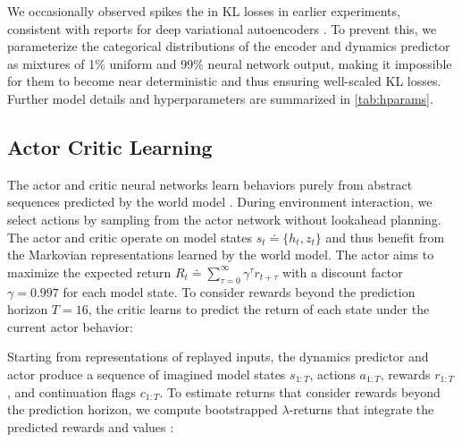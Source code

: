 We occasionally observed spikes the in KL losses in earlier experiments, consistent with reports for deep variational autoencoders \citep{vahdat2020nvae,child2020vdvae}. To prevent this, we parameterize the categorical distributions of the encoder and dynamics predictor as mixtures of 1\% uniform and 99\% neural network output, making it impossible for them to become near deterministic and thus ensuring well-scaled KL losses. Further model details and hyperparameters are summarized in \cref{tab:hparams}.

\subsection*{Actor Critic Learning}

The actor and critic neural networks learn behaviors purely from abstract sequences predicted by the world model \citep{sutton1991dyna,ha2018worldmodels}.
During environment interaction, we select actions by sampling from the actor network without lookahead planning.
The actor and critic operate on model states $s_t \doteq \{h_t,z_t\}$ and thus benefit from the Markovian representations learned by the world model.
The actor aims to maximize the expected return $R_t \doteq \textstyle\sum_{\tau=0}^\infty \gamma^\tau r_{t+\tau}$ with a discount factor $\gamma=0.997$ for each model state.
To consider rewards beyond the prediction horizon $T=16$, the critic learns to predict the return of each state under the current actor behavior:


Starting from representations of replayed inputs, the dynamics predictor and actor produce a sequence of
imagined model states $s_{1:T}$, actions $a_{1:T}$, rewards $r_{1:T}$, and continuation flags $c_{1:T}$. To estimate returns that consider rewards beyond the prediction horizon, we compute bootstrapped $\lambda$-returns that integrate the predicted rewards and values \citep{sutton2018rlbook,schulman2015gae}:


